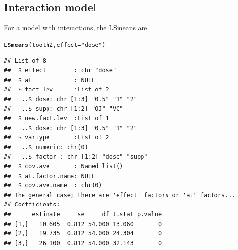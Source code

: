 \documentclass[10pt]{article}\usepackage[]{graphicx}\usepackage[]{color}
\makeatletter
\newcommand{\hlstr}[1]{\textcolor[rgb]{0.192,0.494,0.8}{#1}}%
\newcommand{\hlstd}[1]{\textcolor[rgb]{0.345,0.345,0.345}{#1}}%
\newcommand{\hlkwc}[1]{\textcolor[rgb]{0.333,0.667,0.333}{#1}}%
\newcommand{\hlkwd}[1]{\textcolor[rgb]{0.737,0.353,0.396}{\textbf{#1}}}%
\newenvironment{kframe}{%
 \def\at@end@of@kframe{}%
 \ifinner\ifhmode%
  \def\at@end@of@kframe{\end{minipage}}%
  \begin{minipage}{\columnwidth}%
 \fi\fi%
 \def\FrameCommand##1{\hskip\@totalleftmargin \hskip-\fboxsep
 \colorbox{shadecolor}{##1}\hskip-\fboxsep
     \hskip-\linewidth \hskip-\@totalleftmargin \hskip\columnwidth}%
 \MakeFramed {\advance\hsize-\width
   \@totalleftmargin\z@ \linewidth\hsize
   \@setminipage}}%
 {\par\unskip\endMakeFramed%
 \at@end@of@kframe}
\newenvironment{knitrout}{}{} %
\makeatother
\begin{document}
\subsection{Interaction model}
\label{sec:interaction-model}


For a model with interactions, the LSmeans are
\begin{knitrout}
\color{fgcolor}\begin{kframe}
\begin{alltt}
\hlkwd{LSmeans}\hlstd{(tooth2,} \hlkwc{effect}\hlstd{=}\hlstr{"dose"}\hlstd{)}
\end{alltt}
\begin{verbatim}
## List of 8
##  $ effect        : chr "dose"
##  $ at            : NULL
##  $ fact.lev      :List of 2
##   ..$ dose: chr [1:3] "0.5" "1" "2"
##   ..$ supp: chr [1:2] "OJ" "VC"
##  $ new.fact.lev  :List of 1
##   ..$ dose: chr [1:3] "0.5" "1" "2"
##  $ vartype       :List of 2
##   ..$ numeric: chr(0) 
##   ..$ factor : chr [1:2] "dose" "supp"
##  $ cov.ave       : Named list()
##  $ at.factor.name: NULL
##  $ cov.ave.name  : chr(0) 
## The general case; there are 'effect' factors or 'at' factors...
## Coefficients:
##      estimate     se     df t.stat p.value
## [1,]   10.605  0.812 54.000 13.060       0
## [2,]   19.735  0.812 54.000 24.304       0
## [3,]   26.100  0.812 54.000 32.143       0
\end{verbatim}
\end{kframe}
\end{knitrout}
\end{document}
